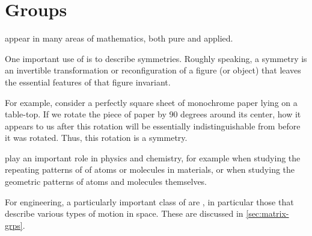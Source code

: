 
\section{Groups}
\label{sec:groups}

 appear in many areas of mathematics, both pure and applied.

One important use of  is to describe symmetries.
Roughly speaking, a symmetry is an invertible transformation or reconfiguration of a figure (or object) that leaves the essential features of that figure invariant.

For example, consider a perfectly square sheet of monochrome paper lying on a table-top.
If we rotate the piece of paper by 90 degrees around its center, how it appears to us after this rotation will be essentially indistinguishable from before it was rotated.
Thus, this rotation is a symmetry.

 play an important role in physics and chemistry, for example when studying the repeating patterns of  of atoms or molecules in materials, or when studying the geometric patterns of atoms and molecules themselves.

For engineering, a particularly important class of  are , in particular those that describe various types of motion in space.
These are discussed in \cref{sec:matrix-grps}.

